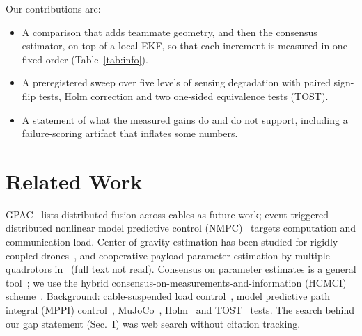 \documentclass[conference]{IEEEtran}
\begin{document}
\noindent Our contributions are:
\begin{itemize}
\item A comparison that adds teammate geometry, and then the consensus estimator, on top of a local EKF, so that each increment is measured in one fixed order (Table~\ref{tab:info}).
\item A preregistered sweep over five levels of sensing degradation with paired sign-flip tests, Holm correction and two one-sided equivalence tests (TOST).
\item A statement of what the measured gains do and do not support, including a failure-scoring artifact that inflates some numbers.
\end{itemize}

\section{Related Work}\label{sec:related}
GPAC~\cite{gpac2026} lists distributed fusion across cables as future work; event-triggered distributed nonlinear model predictive control (NMPC)~\cite{tasooji2025} targets computation and communication load. Center-of-gravity estimation has been studied for rigidly coupled drones~\cite{barawkar2024}, and cooperative payload-parameter estimation by multiple quadrotors in~\cite{arab2021} (full text not read). Consensus on parameter estimates is a general tool~\cite{mendez2026}; we use the hybrid consensus-on-measurements-and-information (HCMCI) scheme~\cite{battistelli_hcmci}. Background: cable-suspended load control~\cite{sreenath2013,lee2018,lee2013multi,sreenath_kumar2013,michael2011}, model predictive path integral (MPPI) control~\cite{williams2017}, MuJoCo~\cite{todorov2012}, Holm~\cite{holm1979} and TOST~\cite{schuirmann1987} tests. The search behind our gap statement (Sec.~I) was web search without citation tracking.
\end{document}
